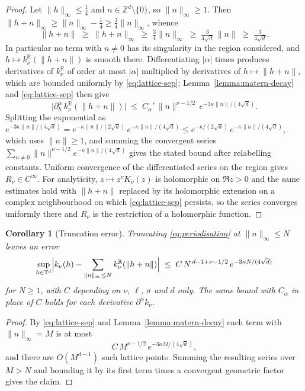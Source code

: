 \documentclass[pdflatex,sn-mathphys,Numbered]{sn-jnl}
\theoremstyle{thmstyleone}%
\newtheorem{corollary}[theorem]{Corollary}%
\theoremstyle{thmstyletwo}%
\theoremstyle{thmstylethree}%
\newcommand{\RR}{\mathbb{R}}
\newcommand{\ZZ}{\mathbb{Z}}
\newcommand{\TT}{\mathbb{T}}
\begin{document}
\begin{appendices}
\begin{proof}
Let $\|h\|_\infty \leq \tfrac14$ and $n \in \ZZ^d\setminus\{0\}$, so
$\|n\|_\infty \geq 1$. Then
$\|h+n\|_\infty \geq \|n\|_\infty - \tfrac14 \geq \tfrac34\|n\|_\infty$, whence
\begin{equation}\label{eq:lattice-sep}
    \|h+n\| \;\geq\; \|h+n\|_\infty \;\geq\; \tfrac34\|n\|_\infty
    \;\geq\; \tfrac{3}{4\sqrt d}\,\|n\| \;\geq\; \tfrac{3}{4\sqrt d} .
\end{equation}
In particular no term with $n \neq 0$ has its singularity in the region
considered, and $h \mapsto k^{\RR}_\nu(\|h+n\|)$ is smooth there. Differentiating
$|\alpha|$ times produces derivatives of $k^{\RR}_\nu$ of order at most
$|\alpha|$ multiplied by derivatives of $h \mapsto \|h+n\|$, which are bounded
uniformly by \eqref{eq:lattice-sep}; Lemma~\ref{lemma:matern-decay} and
\eqref{eq:lattice-sep} then give
\[
    \bigl|\partial^\alpha_h\, k^{\RR}_\nu(\|h+n\|)\bigr|
    \;\leq\; C_\alpha' \, \|n\|^{\nu-1/2}\,
             e^{-3\kappa\|n\|/(4\sqrt d)} .
\]
Splitting the exponential as
$e^{-3\kappa\|n\|/(4\sqrt d)} = e^{-\kappa\|n\|/(2\sqrt d)}\,
e^{-\kappa\|n\|/(4\sqrt d)} \leq e^{-\kappa/(2\sqrt d)}\,e^{-\kappa\|n\|/(4\sqrt d)}$,
which uses $\|n\|\geq1$, and summing the convergent series
$\sum_{n\neq0}\|n\|^{\nu-1/2}e^{-\kappa\|n\|/(4\sqrt d)}$ gives the stated bound
after relabelling constants. Uniform convergence of the
differentiated series on the region gives $R_\nu \in C^\infty$. For
analyticity, $z \mapsto z^\nu K_\nu(z)$ is holomorphic on $\Re z > 0$ and the
same estimates hold with $\|h+n\|$ replaced by its holomorphic extension on a
complex neighbourhood on which \eqref{eq:lattice-sep} persists, so the series
converges uniformly there and $R_\nu$ is the restriction of a holomorphic
function.
\end{proof}

\begin{corollary}[Truncation error]
\label{cor:truncation-error}
Truncating \eqref{eq:periodisation} at $\|n\|_\infty \leq N$ leaves an error
\[
    \sup_{h\in\TT^d}\Bigl|k_\nu(h) - \sum_{\|n\|_\infty \leq N} k^{\RR}_\nu(\|h+n\|)\Bigr|
    \;\leq\; C\,N^{\,d-1+\nu-1/2}\, e^{-3\kappa N/(4\sqrt d)}
\]
for $N \geq 1$, with $C$ depending on $\nu$, $\ell$, $\sigma$ and $d$ only. The
same bound with $C_\alpha$ in place of $C$ holds for each derivative
$\partial^\alpha k_\nu$.
\end{corollary}

\begin{proof}
By \eqref{eq:lattice-sep} and Lemma~\ref{lemma:matern-decay} each term with
$\|n\|_\infty = M$ is at most
\[
    C\,M^{\nu-1/2}\,e^{-3\kappa M/(4\sqrt d)} ,
\]
and there are $O(M^{d-1})$ such lattice points. Summing the resulting series over
$M > N$ and bounding it by its first term times a convergent geometric factor
gives the claim.
\end{proof}


\end{appendices}
\end{document}
